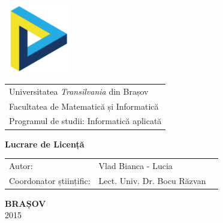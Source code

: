 
\begin{titlepage}
\flushleft
\includegraphics[width=3cm,height=3cm,keepaspectratio]{imagini/sigla.eps} %

\vspace*{-2.8cm}
\flushright
\begin{tabular}{l}
\Large{Universitatea \textit{Transilvania} din Brașov} \\
\Large{Facultatea de Matematică și Informatică}\\
\Large{Programul de studii: Informatică aplicată}
\end{tabular}


\vspace{4cm}

\begin{center}
\Huge{\textbf{Lucrare de Licență}}
\end{center}

\vspace{4cm}
\Large{

\begin{center}
\begin{tabular}{lll}
Autor:& Vlad Bianca - Lucia\\
Coordonator științific:  & Lect. Univ. Dr. Bocu R\u azvan\\
\end{tabular}
\end{center}

\vspace{4cm}

\begin{center}
\textbf{BRAȘOV} \\
 2015
\end{center}
}
\end{titlepage}




